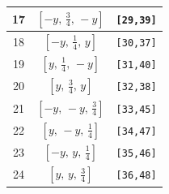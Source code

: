 \documentclass[fleqn,8pt]{jsarticle}
\begin{document}
\begin{longtable}{ccc}
17 & $\left[ - y,\, \frac{3}{4},\, - y \right]$ & {\tt [29,39]} \\ \hline
18 & $\left[ - y,\, \frac{1}{4},\, y \right]$ & {\tt [30,37]} \\ \hline
19 & $\left[ y,\, \frac{1}{4},\, - y \right]$ & {\tt [31,40]} \\ \hline
20 & $\left[ y,\, \frac{3}{4},\, y \right]$ & {\tt [32,38]} \\ \hline
21 & $\left[ - y,\, - y,\, \frac{3}{4} \right]$ & {\tt [33,45]} \\ \hline
22 & $\left[ y,\, - y,\, \frac{1}{4} \right]$ & {\tt [34,47]} \\ \hline
23 & $\left[ - y,\, y,\, \frac{1}{4} \right]$ & {\tt [35,46]} \\ \hline
24 & $\left[ y,\, y,\, \frac{3}{4} \right]$ & {\tt [36,48]} \\
\end{longtable}
\renewcommand{\arraystretch}{1.2}
\end{document}

